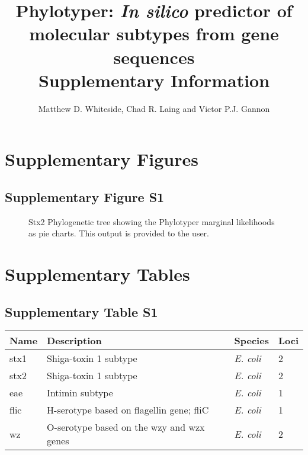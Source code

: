 \documentclass[12pt,letterpaper]{article}
\title{Phylotyper: {\it In silico} predictor of molecular subtypes from gene sequences \\ \large Supplementary Information}
\author{Matthew D. Whiteside, Chad R. Laing and Victor P.J. Gannon}
\date{ }
\begin{document}
 
\maketitle
 
\tableofcontents

\section{Supplementary Figures}

\subsection{Supplementary Figure S1}

\begin{figure}[h!]
\centering
\caption{Stx2 Phylogenetic tree showing the Phylotyper marginal likelihoods as pie charts. This output is provided to the user.}
\end{figure}

\section{Supplementary Tables}

\subsection{Supplementary Table S1}

\begin{minipage}{\linewidth}
\medskip
\begin{tabular}{@{}llll@{}}\toprule Name &
Description & Species & Loci\\\midrule
stx1 & Shiga-toxin 1 subtype & {\it E. coli} & 2 \\
stx2 & Shiga-toxin 1 subtype & {\it E. coli} & 2\\
eae & Intimin subtype & {\it E. coli} & 1\\
flic & H-serotype based on flagellin gene; fliC & {\it E. coli} & 1\\
wz & O-serotype based on the wzy and wzx genes & {\it E. coli} & 2\\\bottomrule
\end{tabular}\par
\bigskip

\end{minipage}

\bigskip
\end{document}
